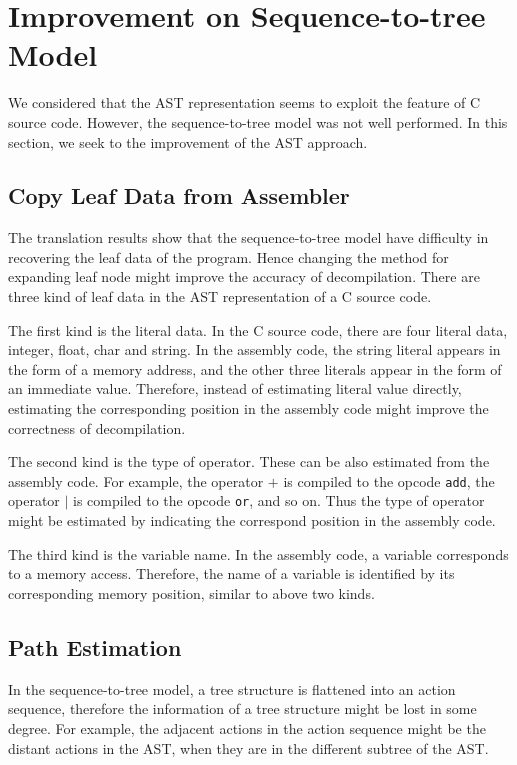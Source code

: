 \documentclass[senior,final,11pt]{iscs-thesis}
\begin{document}
\section{Improvement on Sequence-to-tree Model}
We considered that the AST representation seems to exploit the feature of C source code. 
However, the sequence-to-tree model was not well performed.
In this section, we seek to the improvement of the AST approach.
\subsection{Copy Leaf Data from Assembler}
The translation results show that the sequence-to-tree model have difficulty in recovering the leaf data of the program.
Hence changing the method for expanding leaf node might improve the accuracy of decompilation.
There are three kind of leaf data in the AST representation of a C source code.

The first kind is the literal data. In the C source code, there are four literal data, integer, float, char and string. 
In the assembly code, the string literal appears in the form of a memory address, and the other three literals appear in the form of an immediate value.
Therefore, instead of estimating literal value directly, estimating the corresponding position in the assembly code might improve the correctness of decompilation.

The second kind is the type of operator. These can be also estimated from the assembly code.
For example, the operator $ + $ is compiled to the opcode \texttt{add}, the operator $ | $ is compiled to the opcode \texttt{or}, and so on. 
Thus the type of operator might be estimated by indicating the correspond position in the assembly code.

The third kind is the variable name. In the assembly code, a variable corresponds to a memory access. 
Therefore, the name of a variable is identified by its corresponding memory position, similar to above two kinds.

\subsection{Path Estimation} 
In the sequence-to-tree model, a tree structure is flattened into an action sequence, 
therefore the information of a tree structure might be lost in some degree.
For example, the adjacent actions in the action sequence might be the distant actions in the AST, when they are in the different subtree of the AST.
\end{document}
